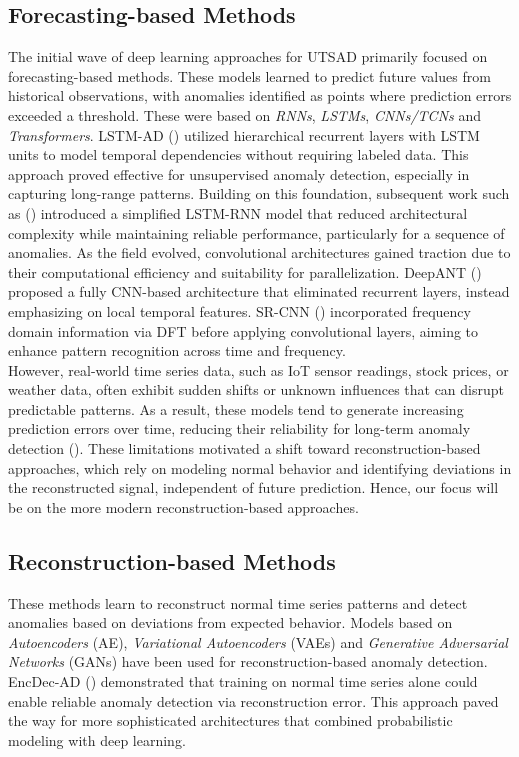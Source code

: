 \subsection{Forecasting-based Methods}
The initial wave of deep learning approaches for UTSAD primarily focused on forecasting-based methods. These
models learned to predict future values from historical observations, with anomalies identified as points where
prediction errors exceeded a threshold. These were based on {\em RNNs}, {\em LSTMs}, {\em CNNs/TCNs} and {\em Transformers}.
LSTM-AD (\cite{lstm-ad}) utilized hierarchical recurrent layers with LSTM units to model temporal
dependencies without requiring labeled data. This approach proved effective for unsupervised anomaly detection,
especially in capturing long-range patterns. Building on this foundation, subsequent work such as (\cite{lstm-ad2})
introduced a simplified LSTM-RNN model that reduced architectural complexity while maintaining reliable performance,
particularly for a sequence of anomalies. As the field evolved, convolutional architectures gained traction due to their
computational efficiency and suitability for parallelization. DeepANT (\cite{deep-ant}) proposed a fully CNN-based
architecture that eliminated recurrent layers, instead emphasizing on local temporal features.  SR-CNN (\cite{srcnn})
incorporated frequency domain information via DFT before applying convolutional layers, aiming to enhance pattern
recognition across time and frequency. 
\\
However, real-world time series data, such as IoT sensor readings, stock prices, or weather data, often exhibit sudden
shifts or unknown influences that can disrupt predictable patterns. As a result, these models tend to generate
increasing prediction errors over time, reducing their reliability for long-term anomaly detection (\cite{anomaly-review}). These limitations motivated a shift toward reconstruction-based approaches, which rely on
modeling normal behavior and identifying deviations in the reconstructed signal, independent of future prediction.
Hence, our focus will be on the more modern reconstruction-based approaches. 

\subsection{Reconstruction-based Methods} 
These methods learn to reconstruct normal time series patterns and detect anomalies based on
deviations from expected behavior. Models based on {\em Autoencoders} (AE), {\em Variational Autoencoders} (VAEs) and
{\em Generative Adversarial Networks} (GANs) have been used for reconstruction-based anomaly detection. EncDec-AD (\cite{lstm-encdec}) demonstrated that training on normal time series alone could enable reliable anomaly detection via
reconstruction error. This approach paved the way for more sophisticated architectures that combined probabilistic
modeling with deep learning. 

